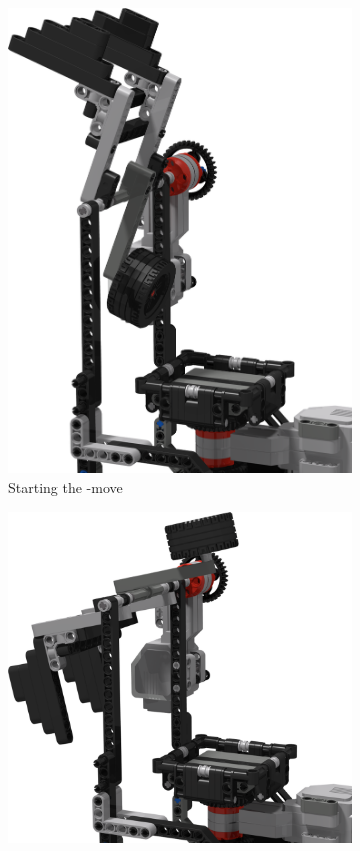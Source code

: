 \documentclass{report}
\newcommand{\move}[1]{\uppercase{\texttt{\formatmovesnospace{#1}}}-move}
\begin{document}
\begin{figure}[H]
\begin{subfigure}[b]{0.22\textwidth}
			\includegraphics[width=\textwidth]{Resources/Images/rdrXMoveArmV1_2.png}
			\caption{Starting the \move{X}}
			\label{fig:rdrXMoveArmV1_2}
		\end{subfigure}
		\hspace{10mm}
		\begin{subfigure}[b]{0.30811\textwidth}
			\includegraphics[width=\textwidth]{Resources/Images/rdrXMoveArmV1_3.png}

\end{subfigure}
\end{figure}
\end{document}
